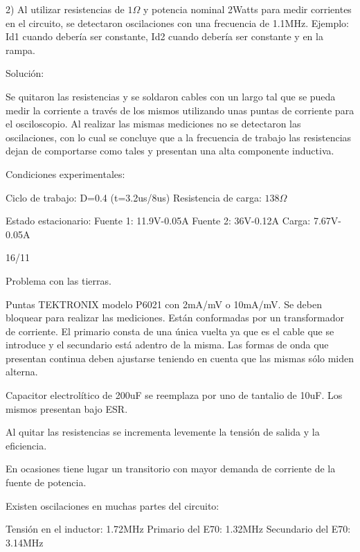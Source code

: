 2) Al utilizar resistencias de $1\Omega$ y potencia nominal 2Watts para medir corrientes en el circuito, 
se detectaron oscilaciones con una frecuencia de 1.1MHz. Ejemplo: Id1 cuando debería ser constante, 
Id2 cuando debería ser constante y en la rampa. 

Solución: 

Se quitaron las resistencias y se soldaron cables con un largo tal que se pueda medir la corriente a través de los mismos 
utilizando unas puntas de corriente para el osciloscopio. Al realizar las mismas mediciones no se detectaron las oscilaciones,
con lo cual se concluye que a la frecuencia de trabajo las resistencias dejan de comportarse como tales y presentan una alta componente inductiva. 

Condiciones experimentales:

Ciclo de trabajo: D=0.4 (t=3.2us/8us)
Resistencia de carga: $138\Omega$

Estado estacionario: 
Fuente 1: 11.9V-0.05A
Fuente 2: 36V-0.12A
Carga: 7.67V-0.05A

16/11

Problema con las tierras.

Puntas TEKTRONIX modelo P6021 con 2mA/mV o 10mA/mV. Se deben bloquear para realizar las mediciones.
Están conformadas por un transformador de corriente. 
El primario consta de una única vuelta ya que es el cable que se introduce y el secundario está adentro de la misma. 
Las formas de onda que presentan continua deben ajustarse teniendo en cuenta que las mismas sólo miden alterna. 

Capacitor electrolítico de 200uF se reemplaza por uno de tantalio de 10uF. Los mismos presentan bajo ESR. 

Al quitar las resistencias se incrementa levemente la tensión de salida y la eficiencia. 

En ocasiones tiene lugar un transitorio con mayor demanda de corriente de la fuente de potencia. 

Existen oscilaciones en muchas partes del circuito:

Tensión en el inductor: 1.72MHz
Primario del E70: 1.32MHz
Secundario del E70: 3.14MHz